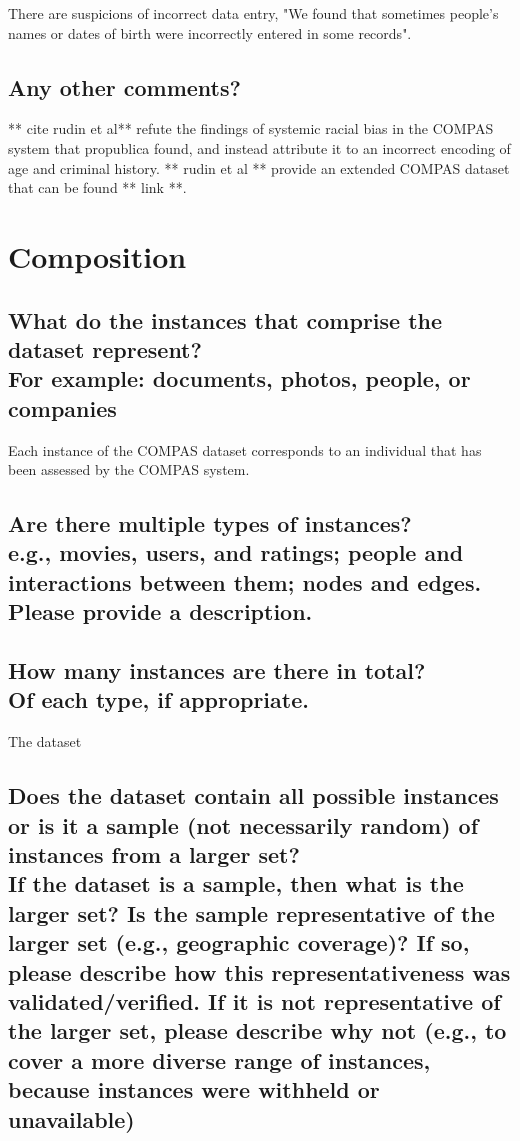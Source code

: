 \documentclass[letterpaper, 10 pt, conference]{ieeeconf}  %
\newcommand{\subtitle}[1]{{\\ \small \normalfont \color{purple} #1}}
\begin{document}
There are suspicions of incorrect data entry, "We found that sometimes people’s names or dates of birth were incorrectly entered in some records". 

\subsection{Any other comments?}

** cite rudin et al** refute the findings of systemic racial bias in the COMPAS system that propublica found, and instead attribute it to an incorrect encoding of age and criminal history. ** rudin et al ** provide an extended COMPAS dataset that can be found ** link **.

\section{Composition}

\subsection{What do the instances that comprise the dataset represent? \subtitle{For example: documents, photos, people, or companies}}

Each instance of the COMPAS dataset corresponds to an individual that has been assessed by the COMPAS system.

\subsection{Are there multiple types of instances? \subtitle{e.g., movies, users, and ratings; people and interactions between them; nodes and edges. Please provide a description.}}

\lipsum[1]

\subsection{How many instances are there in total? \subtitle{Of each type, if appropriate.}}

The dataset

\subsection{Does the dataset contain all possible instances or is it a sample (not necessarily random) of instances from a larger set? \subtitle{If the dataset is a sample, then what is the larger set? Is the sample representative of the larger set (e.g., geographic coverage)? If so, please describe how this representativeness was validated/verified. If it is not representative of the larger set, please describe why not (e.g., to cover a more diverse range of instances, because instances were withheld or unavailable)}}
\end{document}
